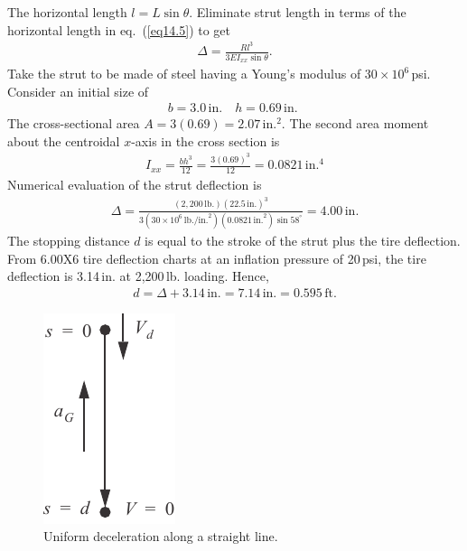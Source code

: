 \documentclass{AeroStructure-ERJohnson}
\begin{document}
\noindent The horizontal length $l=L \sin \theta$. Eliminate strut length in terms of the horizontal length in eq.~(\ref{eq14.5}) to get
\begin{align}\label{eq14.6}
\Delta=\frac{R l^{3}}{3 E I_{x x} \sin \theta}.
\end{align}
Take the strut to be made of steel having a Young's modulus of $30 \times 10^{6}$\,psi. Consider an initial size of
\begin{align}\label{eq14.7}
b=3.0\,\text{in.} \quad h=0.69\,\text{in. }
\end{align}
The cross-sectional area $A=3(0.69)=2.07\,\text{in.}^{2}$. The second area moment about the centroidal $x$-axis in the cross section is
\begin{align}\label{eq14.8}
I_{x x}=\frac{b h^{3}}{12}=\frac{3(0.69)^{3}}{12}=0.0821\,\text{in.}^{4}
\end{align}
Numerical evaluation of the strut deflection is
\begin{align}\label{eq14.9}
\Delta=\frac{(2{,}200\,\mathrm{lb.})(22.5\,\mathrm{in}.)^{3}}{3(30 \times 10^{6}\,\mathrm{lb}./\text{in.}^{2})(0.0821\,\mathrm{in.}^{2}) \sin 58^{\circ}}=4.00\,\mathrm{in.}
\end{align}
The stopping distance $d$ is equal to the stroke of the strut plus the tire deflection. From 6.00X6 tire deflection charts at an inflation pressure of 20\,psi, the tire deflection is 3.14\,in. at 2{,}200\,lb. loading. Hence,
\begin{align}\label{eq14.10}
d=\Delta+3.14\,\text{in.}=7.14\,\text{in.}=0.595\,\mathrm{ft}.
\end{align}

\begin{figure}
\vspace{-19pt}
\includegraphics{Figure_14-3.pdf}
\caption{Uniform deceleration along a straight line.\label{fig14.3}}
\end{figure}
\end{document}
